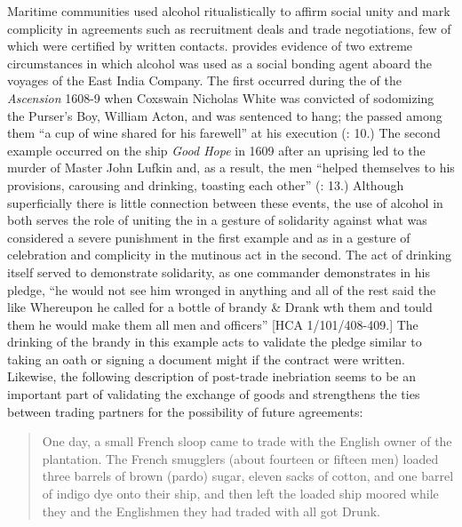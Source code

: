 Maritime communities used alcohol ritualistically to affirm social unity and mark complicity in agreements such as recruitment deals and trade negotiations, few of which were certified by written contacts. \citet{Fury2015} provides evidence of two extreme circumstances in which alcohol was used as a social bonding agent aboard the voyages of the East India Company. The first occurred during the  of the \textit{Ascension} 1608-9 when Coxswain Nicholas White was convicted of sodomizing the Purser’s Boy, William Acton, and was sentenced to hang; the  passed among them “a cup of wine shared for his farewell” at his execution (\citealt{Fury2015}: 10.) The second example occurred on the ship \textit{Good Hope} in 1609 after an uprising led to the murder of Master John Lufkin and, as a result, the men “helped themselves to his provisions, carousing and drinking, toasting each other” (\citealt{Fury2015}: 13.) Although superficially there is little connection between these events, the use of alcohol in both serves the role of uniting the  in a gesture of solidarity against what was considered a severe punishment in the first example and as in a gesture of celebration and complicity in the mutinous act in the second. The act of drinking itself served to demonstrate solidarity, as one commander demonstrates in his pledge, “he would not see him wronged in anything and all of the rest said the like Whereupon he called for a bottle of brandy \& Drank wth them and tould them he would make them all men and officers” [HCA 1/101/408-409.] The drinking of the brandy in this example acts to validate the pledge similar to taking an oath or signing a document might if the contract were written. Likewise, the following description of post-trade inebriation seems to be an important part of validating the exchange of goods and strengthens the ties between trading partners for the possibility of future agreements:

\begin{quotation}
One day, a small French sloop came to trade with the English owner of the plantation.  The French smugglers (about fourteen or fifteen men) loaded three barrels of brown (pardo) sugar, eleven sacks of cotton, and one barrel of indigo dye onto their ship, and then left the loaded ship moored while they and the Englishmen they had traded with all got Drunk. \citep[15]{Hatfield2016} 
\end{quotation}

